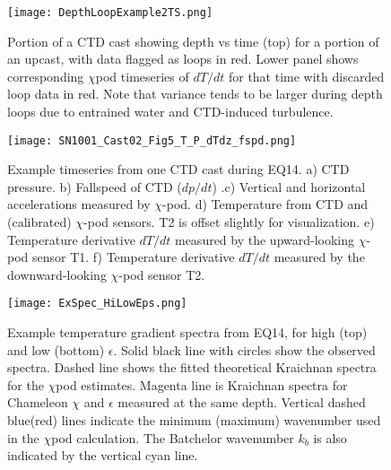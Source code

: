 \documentclass{ametsoc}
\begin{document}

\begin{figure}[t]
  \noindent\texttt{[image: DepthLoopExample2TS.png]}\\
  \caption{Portion of a CTD cast showing depth vs time (top) for a portion of an upcast, with data flagged as loops in red. Lower panel shows corresponding $\chi$pod timeseries of $dT/dt$ for that time with discarded loop data in red. Note that variance tends to be larger during depth loops due to entrained water and CTD-induced turbulence.}
  \label{depthloops2}
\end{figure}


\begin{figure}[t]
  \noindent\texttt{[image: SN1001\_Cast02\_Fig5\_T\_P\_dTdz\_fspd.png]}\\
  \caption{Example timeseries from one CTD cast during EQ14. a) CTD pressure. b) Fallspeed of CTD ($dp/dt$) .c) Vertical and horizontal accelerations measured by $\chi$-pod. d) Temperature from CTD and (calibrated) $\chi$-pod sensors. T2 is offset slightly for visualization. e) Temperature derivative $dT/dt$ measured by the upward-looking $\chi$-pod sensor T1. f) Temperature derivative $dT/dt$ measured by the downward-looking $\chi$-pod sensor T2.}
  \label{f2}
\end{figure}



\begin{figure}[t]
  \noindent\texttt{[image: ExSpec\_HiLowEps.png]}\\
  \caption{Example temperature gradient spectra from EQ14, for high (top) and low (bottom) $\epsilon$. Solid black line with circles show the observed spectra. Dashed line shows the fitted theoretical Kraichnan spectra for the $\chi$pod estimates. Magenta line is Kraichnan spectra for Chameleon $\chi$ and $\epsilon$ measured at the same depth. Vertical dashed blue(red) lines indicate the minimum (maximum) wavenumber used in the $\chi$pod calculation. The Batchelor wavenumber $k_b$ is also indicated by the vertical cyan line.}
  \label{specexamp}
\end{figure}
\end{document}

